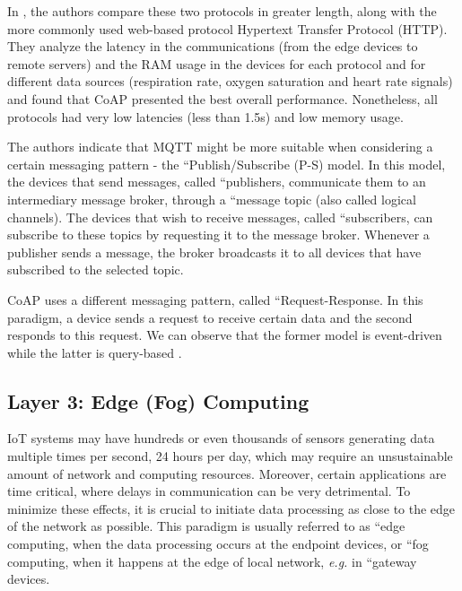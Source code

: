 In \cite{Rubi2019}, the authors compare these two protocols in greater length, along with the more commonly used web-based protocol Hypertext Transfer Protocol (HTTP). They analyze the latency in the communications (from the edge devices to remote servers) and the RAM usage in the devices for each protocol and for different data sources (respiration rate, oxygen saturation and heart rate signals) and found that \acs{CoAP} presented the best overall performance. Nonetheless, all protocols had very low latencies (less than 1.5s) and low memory usage. \bigskip

The authors indicate that \acs{MQTT} might be more suitable when considering a certain messaging pattern - the ``Publish/Subscribe (P-S) model. In this model, the devices that send messages, called ``publishers, communicate them to an intermediary message broker, through a ``message topic (also called logical channels). The devices that wish to receive messages, called ``subscribers, can subscribe to these topics by requesting it to the message broker. Whenever a publisher sends a message, the broker broadcasts it to all devices that have subscribed to the selected topic. \bigskip

\acs{CoAP} uses a different messaging pattern, called ``Request-Response. In this paradigm, a device sends a request to receive certain data and the second responds to this request. We can observe that the former model is event-driven while the latter is query-based \cite{Rubi2019}. %

\subsection{Layer 3: Edge (Fog) Computing}
\label{sec:iot-model-layer3}

\acs{IoT} systems may have hundreds or even thousands of sensors generating data multiple times per second, 24 hours per day, which may require an unsustainable amount of network and computing resources. Moreover, certain applications are time critical, where delays in communication can be very detrimental. To minimize these effects, it is crucial to initiate data processing as close to the edge of the network as possible. This paradigm is usually referred to as ``edge computing, when the data processing occurs at the endpoint devices, or ``fog computing, when it happens at the edge of local network, \textit{e.g.} in ``gateway devices. \bigskip

